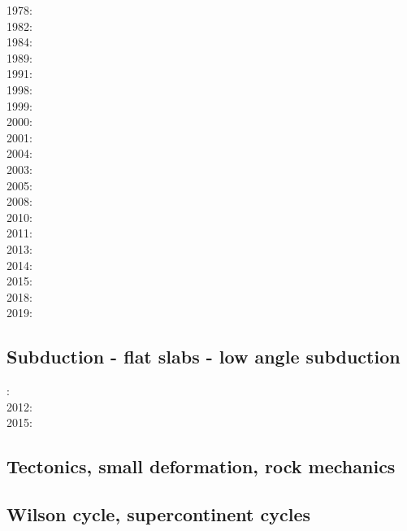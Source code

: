 1978: \cite{bird78}\\
1982: \cite{clwv82}\\
1984: \cite{cade84}\\
1989: \cite{clwv89}\\
1991: \cite{muph91}\\
1998: \cite{togu98}\\
1999: \cite{fagd99}\\
2000: \cite{pybf00}\\
2001: \cite{dohe01}\cite{reyb01}\cite{brry01}\\
2004: \cite{ster04}\cite{guhl04}\\
2003: \cite{hags03}\\
2005: \cite{bihi05}\\
2008: \cite{uegs08}\\
2010: \cite{nigm10}\cite{bucl10}\\
2011: \cite{bagw11}\cite{nigm11}\\
2013: \cite{dyge13}\cite{mana13}\\
2014: \cite{recf14}\cite{macg14}\\
2015: \cite{matv15}\cite{pebu15}\cite{vapm15}\\
2018: \cite{zhlg18}\cite{basq18}\\
2019: \cite{begb19}\cite{gubg19}

\subsection*{Subduction - flat slabs - low angle subduction}

: \cite{cube11}\\
2012: \cite{mapm12}\\
2015: \cite{gehm15}

\subsection*{Tectonics, small deformation, rock mechanics}

\cite{ilma93}
\cite{hept96}
\cite{esfm08}
\cite{lega12}

\subsection*{Wilson cycle, supercontinent cycles}

